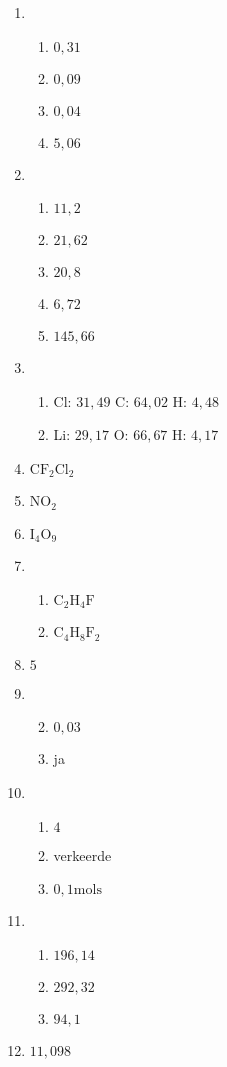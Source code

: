\begin{multicols}{4}
\begin{enumerate}[noitemsep, label=\textbf{(\arabic*)} ]
\item
\begin{enumerate}[noitemsep, label=\textbf{(\alph*)} ]
 \item $0,31$
\item $0,09$
\item $0,04$
\item $5,06$
\end{enumerate}
\item
\begin{enumerate}[noitemsep, label=\textbf{(\alph*)} ]
 \item $11,2$
\item $21,62$
\item $20,8$
\item $6,72$
\item $145,66$
\end{enumerate}
\item
\begin{enumerate}[noitemsep, label=\textbf{(\alph*)} ]
 \item Cl: $31,49$ C: $64,02$ H: $4,48$
\item Li: $29,17$ O: $66,67$ H: $4,17$ 
\end{enumerate}
\item $\text{CF}_{2}\text{Cl}_{2}$
\item $\text{NO}_{2}$
\item $\text{I}_{4}\text{O}_{9}$
\item 
\begin{enumerate}[noitemsep, label=\textbf{(\alph*)} ]
 \item $\text{C}_{2}\text{H}_{4}\text{F}$
\item $\text{C}_{4}\text{H}_{8}\text{F}_{2}$
\end{enumerate}
\item $5$
\item
\begin{enumerate}[noitemsep, label=\textbf{(\alph*)} ]
\setcounter{enumii}{1}
\item $0,03$
\item ja
\end{enumerate}
\item
\begin{enumerate}[noitemsep, label=\textbf{(\alph*)} ]
 \item $4$
\item verkeerde
\item $0,1 \text{mols}$
\end{enumerate}
\item
\begin{enumerate}[noitemsep, label=\textbf{(\alph*)} ]
 \item $196,14$
\item $292,32$
\item $94,1$
\end{enumerate}
\item $11,098$
 \end{enumerate}
\end{multicols}

